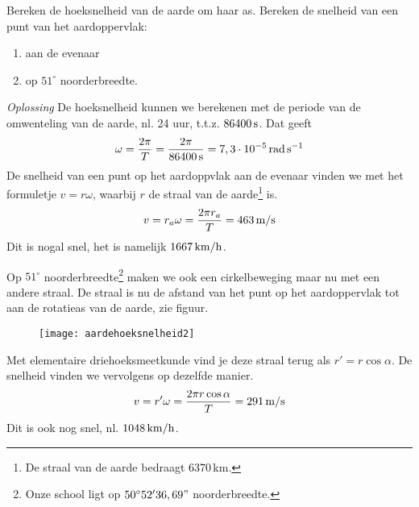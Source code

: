 \documentclass{ximera}
\begin{document}
\begin{exercise}[Opgave] Bereken de hoeksnelheid van de aarde om haar as. Bereken de
snelheid van een punt van het aardoppervlak:
\begin{enumerate}
\item aan de evenaar
\item op $51^\circ$ noorderbreedte.
\end{enumerate}
\begin{oplossing}
\item[\textit{Oplossing}]De hoeksnelheid kunnen we berekenen met de periode van de omwenteling van de aarde, nl. 24 uur, t.t.z. $86400\rm\,s$. Dat geeft
\begin{eqnarray*}
\omega=\frac{2\pi}{T}=\frac{2\pi}{86400\rm\,s}=7,3\cdot10^{-5}\rm\,rad\,s^{-1}
\end{eqnarray*}
De snelheid van een punt op het aardoppvlak aan de evenaar vinden we met het formuletje $v=r\omega$, waarbij $r$ de straal van de aarde\footnote{De straal van de aarde bedraagt 6370\rm\,km.} is.
\begin{eqnarray*}
v=r_a\omega=\frac{2\pi r_a}{T}=463\rm\,m/s
\end{eqnarray*}
Dit is nogal snel, het is namelijk $1667\rm\,km/h$. 

Op $51^\circ$ noorderbreedte\footnote{Onze school ligt op $50^\circ 52'36,69"$ noorderbreedte.} maken we ook een cirkelbeweging maar nu met een andere straal. De straal is nu de afstand van het punt op het aardoppervlak tot aan de rotatieas van de aarde, zie figuur. 
\begin{figure}[h]
\centering
\texttt{[image: aardehoeksnelheid2]}
\end{figure}
Met elementaire driehoeksmeetkunde vind je deze straal terug als $r'=r\cos\alpha$. De snelheid vinden we vervolgens op dezelfde manier.
\begin{eqnarray*}
v=r'\omega=\frac{2\pi r\cos\alpha}{T}=291\rm\,m/s
\end{eqnarray*}
Dit is ook nog snel, nl. $1048\rm\,km/h$.
\end{oplossing}



\end{exercise}
\end{document}
